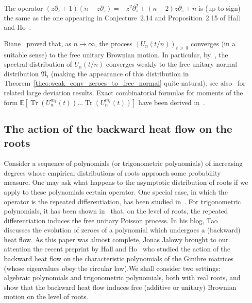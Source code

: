 \documentclass[AHL,Unicode,longabstracts,published]{cedram}
\DeclareMathOperator*{\Tr}{Tr}
\newcommand{\fnorm}{\mathfrak{N}}
\newcommand{\E}{\mathbb{E}}
\begin{document}
\begin{rema}
The operator $(z \partial_z + 1) (n-z\partial_z) = -z^2 \partial_z^2 + (n-2) z \partial_z + n$ is (up to sign) the same as the one appearing in Conjecture~2.14 and Proposition~2.15 of Hall and Ho~\cite{hall_ho}.
\end{rema}



Biane~\cite{biane,biane_segal_bargmann} proved that, as $n\to\infty$, the process $(U_n(t/n))_{t\,\geq\,0}$ converges (in a suitable sense) to the free unitary Brownian motion. In particular, by~\cite[Theorem~1]{biane}, the spectral distribution of $U_n(t/n)$ converges weakly to the free unitary normal distribution $\fnorm_{t}$ (making the appearance of this distribution in Theorem~\ref{theo:weak_conv_zeroes_to_free_normal} quite natural); see also~\cite[Section~3.3]{cabanal_duvillard_guionnet} for related large deviation results. Exact combinatorial formulas for moments of the form $\E [\Tr (U_n^{m_1}(t))\ldots \Tr (U_n^{m_r}(t))] $ have been derived in~\cite{levy_schur_weyl}.


\subsection{The action of the backward heat flow on the roots} Consider a sequence of polynomials (or trigonometric polynomials) of increasing degrees whose empirical distributions of roots approach some probability measure. One may ask what happens to the asymptotic distribution of roots if we apply to these polynomials certain operator. One special case, in which the operator is the repeated differentiation, has been studied in~\cite{arizmendi_garza_vargas_perales,bogvad_etal,
galligo,
hoskins_kabluchko,
kabluchko_rep_diff_free_poi,
kiselev_tan,
orourke_steinerberger_nonlocal,
steinerberger_real,
steinerberger_conservation,
steinerberger_free}. For trigonometric polynomials, it has been shown in~\cite{kabluchko_rep_diff_free_poi} that, on the level of roots, the repeated differentiation induces the free unitary Poisson process. In his blog, Tao~\cite{tao_blog1,tao_blog2} discusses the evolution of zeroes of a polynomial which undergoes a (backward) heat flow. As this paper was almost complete, Jonas Jalowy brought to our attention the recent preprint by Hall and Ho~\cite{hall_ho} who studied the action of the backward heat flow on the characteristic polynomials of the Ginibre matrices (whose eigenvalues obey the circular law).\linebreak We shall consider two settings: algebraic polynomials and trigonometric polynomials, both with real roots, and show that the backward heat flow induces free (additive or unitary) Brownian motion on the level of roots.
\end{document}
